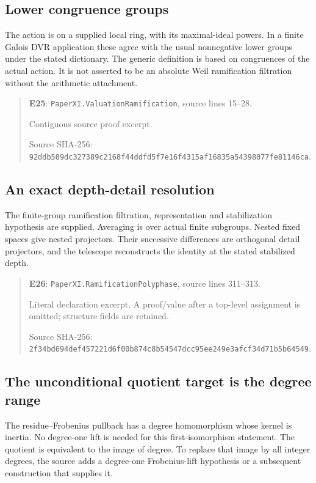 \documentclass[10pt,oneside]{book}
\begin{document}
\subsection{Lower congruence groups}
\label{guide:E25}
The action is on a supplied local ring, with its maximal-ideal powers. In a finite Galois DVR application these agree with the usual nonnegative lower groups under the stated dictionary.
The generic definition is based on congruences of the actual action. It is not asserted to be an absolute Weil ramification filtration without the arithmetic attachment.

\begin{quote}\footnotesize\textbf{E25}: \nolinkurl{PaperXI.ValuationRamification}, source lines 15--28.\par Contiguous source proof excerpt.\par Source SHA-256: {\scriptsize\texttt{92ddb509dc327389c2168f44ddfd5f7e16f4315af16835a54398077fe81146ca}}.\end{quote}


\subsection{An exact depth-detail resolution}
\label{guide:E26}
The finite-group ramification filtration, representation and stabilization hypothesis are supplied. Averaging is over actual finite subgroups.
Nested fixed spaces give nested projectors. Their successive differences are orthogonal detail projectors, and the telescope reconstructs the identity at the stated stabilized depth.

\begin{quote}\footnotesize\textbf{E26}: \nolinkurl{PaperXI.RamificationPolyphase}, source lines 311--313.\par Literal declaration excerpt. A proof/value after a top-level assignment is omitted; structure fields are retained.\par Source SHA-256: {\scriptsize\texttt{2f34bd694def457221d6f00b874c8b54547dcc95ee249e3afcf34d71b5b64549}}.\end{quote}


\subsection{The unconditional quotient target is the degree range}
\label{guide:E27}
The residue--Frobenius pullback has a degree homomorphism whose kernel is inertia. No degree-one lift is needed for this first-isomorphism statement.
The quotient is equivalent to the image of degree. To replace that image by all integer degrees, the source adds a degree-one Frobenius-lift hypothesis or a subsequent construction that supplies it.
\end{document}
